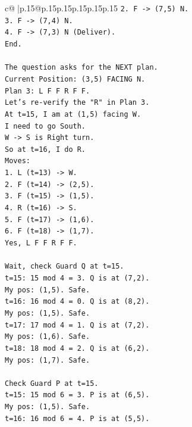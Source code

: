 \documentclass{article}
\begin{document}
{\begin{supertabular}{c@{$\;$}|p{.15\linewidth}@{}p{.15\linewidth}p{.15\linewidth}p{.15\linewidth}p{.15\linewidth}p{.15\linewidth}}
{{{\texttt{2. F {-}> (7,5) N.} \\
\texttt{3. F {-}> (7,4) N.} \\
\texttt{4. F {-}> (7,3) N (Deliver).} \\
\texttt{End.} \\
\\ 
\texttt{The question asks for the NEXT plan.} \\
\texttt{Current Position: (3,5) FACING N.} \\
\texttt{Plan 3: L F F R F F.} \\
\texttt{Let's re{-}verify the "R" in Plan 3.} \\
\texttt{At t=15, I am at (1,5) facing W.} \\
\texttt{I need to go South.} \\
\texttt{W {-}> S is Right turn.} \\
\texttt{So at t=16, I do R.} \\
\texttt{Moves:} \\
\texttt{1. L (t=13) {-}> W.} \\
\texttt{2. F (t=14) {-}> (2,5).} \\
\texttt{3. F (t=15) {-}> (1,5).} \\
\texttt{4. R (t=16) {-}> S.} \\
\texttt{5. F (t=17) {-}> (1,6).} \\
\texttt{6. F (t=18) {-}> (1,7).} \\
\texttt{Yes, L F F R F F.} \\
\\ 
\texttt{Wait, check Guard Q at t=15.} \\
\texttt{t=15: 15 mod 4 = 3. Q is at (7,2).} \\
\texttt{My pos: (1,5). Safe.} \\
\texttt{t=16: 16 mod 4 = 0. Q is at (8,2).} \\
\texttt{My pos: (1,5). Safe.} \\
\texttt{t=17: 17 mod 4 = 1. Q is at (7,2).} \\
\texttt{My pos: (1,6). Safe.} \\
\texttt{t=18: 18 mod 4 = 2. Q is at (6,2).} \\
\texttt{My pos: (1,7). Safe.} \\
\\ 
\texttt{Check Guard P at t=15.} \\
\texttt{t=15: 15 mod 6 = 3. P is at (6,5).} \\
\texttt{My pos: (1,5). Safe.} \\
\texttt{t=16: 16 mod 6 = 4. P is at (5,5).} \\
}}}
\end{supertabular}}
\end{document}
